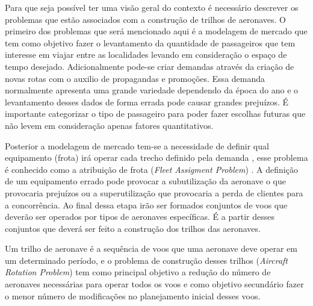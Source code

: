 Para que seja possível ter uma visão geral do contexto é necessário descrever os
problemas que estão associados com a construção de trilhos de aeronaves. O
primeiro dos problemas que será mencionado aqui é a modelagem de mercado que tem
como objetivo fazer o levantamento da quantidade de passageiros que tem
interesse em viajar entre as localidades levando em consideração o espaço de
tempo desejado. Adicionalmente pode-se criar demandas através da criação de
novas rotas com o auxilio de propagandas e promoções. Essa demanda normalmente
apresenta uma grande variedade dependendo da época do ano e o levantamento desses dados de forma errada pode
causar grandes prejuízos. É importante categorizar o tipo de passageiro para
poder fazer escolhas futuras que não levem em consideração apenas fatores
quantitativos.

Posterior a modelagem de mercado tem-se a necessidade de definir qual
equipamento (frota) irá operar cada trecho definido pela
demanda \cite{pimentel2005}, esse problema é conhecido como a atribuição de
frota (\textit{Fleet Assigment Problem}) . A definição de um equipamento errado
pode provocar a subutilização da aeronave o que provocaria prejuízos ou a
superutilização que provocaria a perda de clientes para a
concorrência. Ao final dessa etapa irão ser formados
conjuntos de voos que deverão ser operados por tipos de aeronaves específicas. É a partir desses conjuntos que deverá ser feito a
construção dos trilhos das aeronaves.

Um trilho de aeronave é a sequência de voos que uma aeronave deve operar em um
determinado período, e o problema de construção desses trilhos 
(\textit{Aircraft Rotation Problem}) tem como principal objetivo a
redução do número de aeronaves necessárias para operar todos os voos e como
objetivo secundário fazer o menor número de modificações no planejamento inicial desses
voos.

